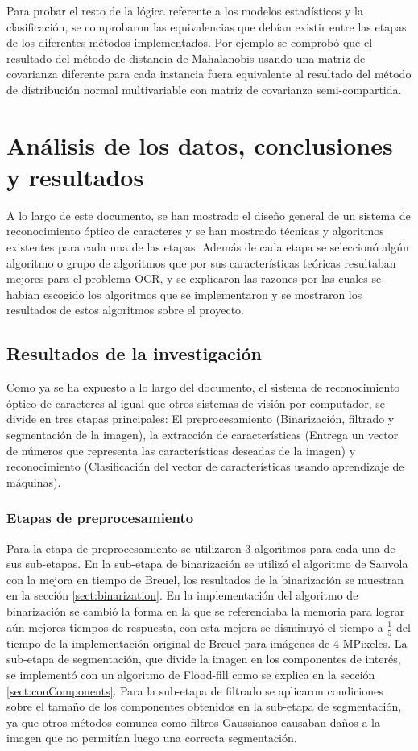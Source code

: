 \documentclass[a4paper, 11pt, oneside]{report}
\begin{document}
Para probar el resto de la lógica referente a los modelos estadísticos y la clasificación, se comprobaron las equivalencias que debían existir entre las etapas de los diferentes métodos implementados. Por ejemplo se comprobó que el resultado del método de distancia de Mahalanobis usando una matriz de covarianza diferente para cada instancia fuera equivalente al resultado del método de distribución normal multivariable con matriz de covarianza semi-compartida.


\chapter{Análisis de los datos, conclusiones y resultados}
\label{chap:results}
A lo largo de este documento, se han mostrado el diseño general de un sistema de reconocimiento óptico de caracteres y se han mostrado técnicas y algoritmos existentes para cada una de las etapas. Además de cada etapa se seleccionó algún algoritmo o grupo de algoritmos que por sus características teóricas resultaban mejores para el problema OCR, y se explicaron las razones por las cuales se habían escogido los algoritmos que se implementaron y se mostraron los resultados de estos algoritmos sobre el proyecto.

\section{Resultados de la investigación}
Como ya se ha expuesto a lo largo del documento, el sistema de reconocimiento óptico de caracteres al igual que otros sistemas de visión por computador, se divide en tres etapas principales: El preprocesamiento (Binarización, filtrado y segmentación de la imagen), la extracción de características (Entrega un vector de números que representa las características deseadas de la imagen) y reconocimiento (Clasificación del vector de características usando aprendizaje de máquinas).

\subsection{Etapas de preprocesamiento}
Para la etapa de preprocesamiento se utilizaron 3 algoritmos para cada una de sus sub-etapas. En la sub-etapa de binarización se utilizó el algoritmo de Sauvola con la mejora en tiempo de Breuel, los resultados de la binarización se muestran en la sección \ref{sect:binarization}. En la implementación del algoritmo de binarización se cambió la forma en la que se referenciaba la memoria para lograr aún mejores tiempos de respuesta, con esta mejora se disminuyó el tiempo a $\frac{1}{5}$ del tiempo de la implementación original de Breuel para imágenes de 4 MPixeles. %
La sub-etapa de segmentación, que divide la imagen en los componentes de interés, se implementó con un algoritmo de Flood-fill como se explica en la sección \ref{sect:conComponents}. Para la sub-etapa de filtrado se aplicaron condiciones sobre el tamaño de los componentes obtenidos en la sub-etapa de segmentación, ya que otros métodos comunes como filtros Gaussianos causaban daños a la imagen que no permitían luego una correcta segmentación.
\end{document}
